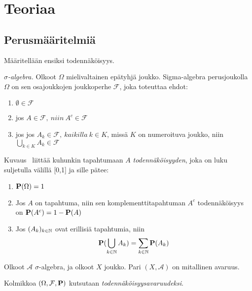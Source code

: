 


\chapter{Teoriaa}\label{teor}

\section{Perusmääritelmiä}

Määritellään ensiksi todennäköisyys.

\begin{maar}
	\textit{$\sigma$-algebra.} Olkoot $\Omega$ mielivaltainen epätyhjä joukko. Sigma-algebra perusjoukolla $\Omega$ on sen osajoukkojen joukkoperhe $\mathcal{F}$, joka toteuttaa ehdot:
	
	\begin{enumerate}
		\item $\emptyset\in\mathcal{F}$
		\item jos $A\in\mathcal{F},\ niin\ A^c \in\mathcal{F}$
		\item jos jos $A_k\in\mathcal{F},\ kaikilla\ k\in K$, missä $K$ on numeroituva joukko, niin $\bigcup_{k\in K} A_k \in \mathcal{F}$
	\end{enumerate}
\end{maar}

\begin{maar}
	Kuvaus \pr\ liittää kuhunkin tapahtumaan $A$ \textit{todennäköisyyden}, joka on luku suljetulla välillä [0,1] ja sille pätee:
	\begin{enumerate}
		\item $\textbf{P}(\Omega)=1$
		\item Jos $A$ on tapahtuma, niin sen komplementtitapahtuman $A^c$ todennäköisyys on $\textbf{P}(A^c)= 1 - \textbf{P}(A)$
		\item Jos $(A_k)_{k\in\mathbb{N}}$ ovat erillisiä tapahtumia, niin 
		\begin{displaymath}
			\textbf{P}(\bigcup_{k\in\mathbb{N}} A_k) = \sum_{k\in\mathbb{N}}\textbf{P}(A_k)
		\end{displaymath}
	\end{enumerate}
\end{maar}

\begin{maar}
	Olkoot $\mathcal{A}$ $\sigma$-algebra, ja olkoot $X$ joukko. Pari $(X, \mathcal{A})$ on mitallinen avaruus.
\end{maar}

\begin{maar}
	Kolmikkoa $(\Omega, \mathcal{F}, \textbf{P} )$ kutsutaan \textit{todennäköisyysavaruudeksi}.
\end{maar}


